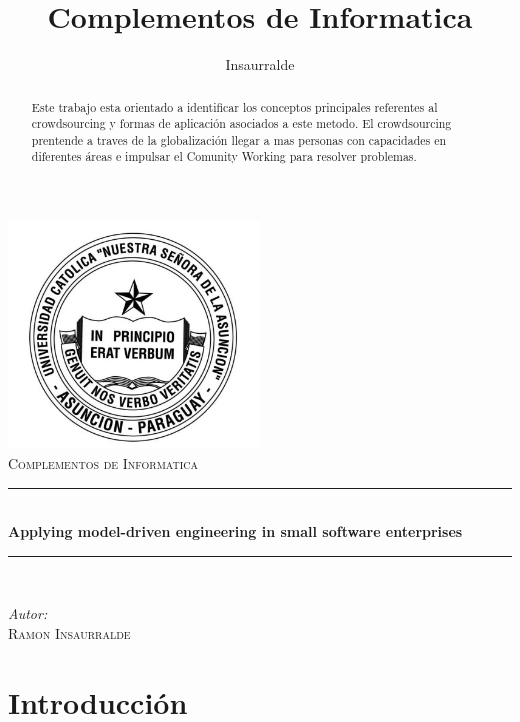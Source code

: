 \documentclass[letterpaper]{article}
\title{Complementos de Informatica}
\author{Insaurralde}
\newcommand{\HRule}{\rule{\linewidth}{0.5mm}}
\begin{document}
	\begin{titlepage}
		\begin{center}
			\includegraphics[width=0.5\textwidth]{img/logo_uca.jpg}\\[1cm]    
			\textsc{\LARGE Complementos de Informatica}\\[1.5cm]


			\HRule \\[0.4cm]
			{ \huge \bfseries Applying model-driven engineering in small software
enterprises }\\[0.4cm]
			\HRule \\[0.4cm]

			\begin{minipage}{0.4\textwidth}
				\begin{flushleft} \large
					\emph{Autor:} \\ \textsc{Ramon Insaurralde}
				\end{flushleft}
			\end{minipage}
		
			\vfill
		\begin{abstract}
				Este trabajo esta orientado a identificar los conceptos principales referentes al crowdsourcing y formas de aplicación asociados a este metodo. El crowdsourcing prentende a traves de la globalización llegar a mas personas con capacidades en diferentes áreas e impulsar el Comunity Working para resolver problemas.	             
		
			\end{abstract}

		\end{center}
	\end{titlepage}

	\tableofcontents
	\newpage
	\section{Introducción}
\end{document}

